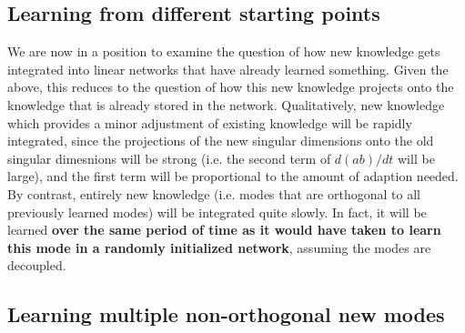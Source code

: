 \documentclass{article}
\begin{document}
\subsection{Learning from different starting points}
We are now in a position to examine the question of how new knowledge gets integrated into linear networks that have already learned something. Given the above, this reduces to the question of how this new knowledge projects onto the knowledge that is already stored in the network. Qualitatively, new knowledge which provides a minor adjustment of existing knowledge will be rapidly integrated, since the projections of the new singular dimensions onto the old singular dimesnions will be strong (i.e. the second term of $d(ab)/dt$ will be large), and the first term will be proportional to the amount of adaption needed. By contrast, entirely new knowledge (i.e. modes that are orthogonal to all previously learned modes) will be integrated quite slowly. In fact, it will be learned \textbf{over the same period of time as it would have taken to learn this mode in a randomly initialized network}, assuming the modes are decoupled. \color{red}{[simulations here]} 
\subsection{Learning multiple non-orthogonal new modes}
\end{document}

